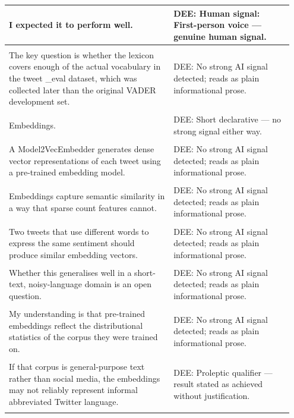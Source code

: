 \documentclass[11pt]{article}
\begin{document}
\begin{longtable}{|p{0.55\linewidth}|p{0.40\linewidth}|}
I expected it to perform well. & DEE: Human signal: First-person voice --- genuine human signal. \\[2pt]
\hline
\rule{0pt}{3.5cm} & \\
\hline
The key question is whether the lexicon covers enough of the actual vocabulary in the tweet \_eval dataset, which was collected later than the original VADER development set. & DEE: No strong AI signal detected; reads as plain informational prose. \\[2pt]
\hline
\rule{0pt}{3.5cm} & \\
\hline
Embeddings. & DEE: Short declarative --- no strong signal either way. \\[2pt]
\hline
\rule{0pt}{3.5cm} & \\
\hline
A Model2VecEmbedder generates dense vector representations of each tweet using a pre-trained embedding model. & DEE: No strong AI signal detected; reads as plain informational prose. \\[2pt]
\hline
\rule{0pt}{3.5cm} & \\
\hline
Embeddings capture semantic similarity in a way that sparse count features cannot. & DEE: No strong AI signal detected; reads as plain informational prose. \\[2pt]
\hline
\rule{0pt}{3.5cm} & \\
\hline
Two tweets that use different words to express the same sentiment should produce similar embedding vectors. & DEE: No strong AI signal detected; reads as plain informational prose. \\[2pt]
\hline
\rule{0pt}{3.5cm} & \\
\hline
Whether this generalises well in a short-text, noisy-language domain is an open question. & DEE: No strong AI signal detected; reads as plain informational prose. \\[2pt]
\hline
\rule{0pt}{3.5cm} & \\
\hline
My understanding is that pre-trained embeddings reflect the distributional statistics of the corpus they were trained on. & DEE: No strong AI signal detected; reads as plain informational prose. \\[2pt]
\hline
\rule{0pt}{3.5cm} & \\
\hline
If that corpus is general-purpose text rather than social media, the embeddings may not reliably represent informal abbreviated Twitter language. & DEE: Proleptic qualifier --- result stated as achieved without justification. \\[2pt]
\hline
\rule{0pt}{3.5cm} & \\

\end{longtable}
\end{document}
